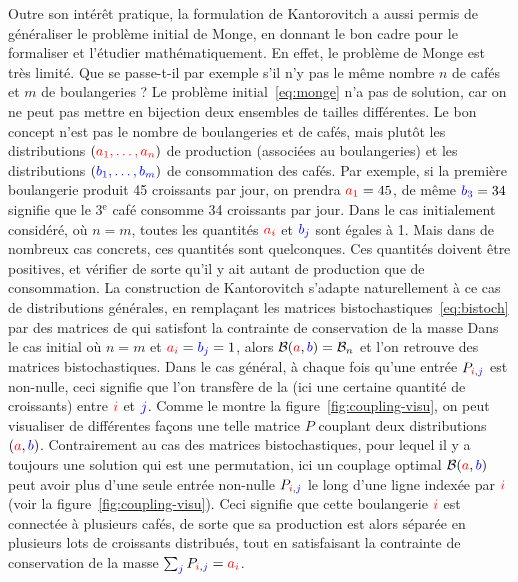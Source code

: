 Outre son intérêt pratique, la formulation de Kantorovitch a aussi permis de généraliser le problème initial de Monge, en donnant le bon cadre pour le formaliser et l'étudier mathématiquement. En effet, le problème de Monge est très limité. Que se passe-t-il par exemple s'il n'y pas le même nombre $n$ de cafés et $m$ de boulangeries ? Le problème initial~\eqref{eq:monge} n'a pas de solution, car on ne peut pas mettre en bijection deux ensembles de tailles différentes. Le bon concept n'est pas le nombre de boulangeries et de cafés, mais plutôt les distributions $({\color{red}a_1,\ldots,a_n})$ de production (associées au boulangeries) et les distributions $({\color{blue}b_1,\ldots,b_m})$ de consommation des cafés. 
%
Par exemple, si la première boulangerie produit 45 croissants par jour, on prendra ${\color{red}a_1} =45$, de même ${\color{blue}b_3} = 34$ signifie que le 3$^\text{e}$ café consomme 34 croissants par jour.
%
Dans le cas initialement considéré, où $n=m$, toutes les quantités ${\color{red}a_i}$ et ${\color{blue}b_j}$ sont égales à 1. Mais dans de nombreux cas concrets, ces quantités sont quelconques. Ces quantités doivent être positives, et vérifier 
de sorte qu'il y ait autant de production que de consommation. La construction de Kantorovitch s'adapte naturellement à ce cas de distributions générales, en remplaçant les matrices bistochastiques~\eqref{eq:bistoch} par des matrices de  qui satisfont la contrainte de conservation de la masse 
Dans le cas initial où $n=m$ et ${\color{red}a_i}={\color{blue}b_j}=1$, alors $\mathcal{B}({\color{red}a},{\color{blue}b}) = \mathcal{B}_n$ et l'on retrouve des matrices bistochastiques. Dans le cas général, à chaque fois qu'une entrée $P_{{\color{red}i},{\color{blue}j}}$ est non-nulle, ceci signifie que l'on transfère de la  (ici une certaine quantité de croissants) entre ${\color{red}i}$ et ${\color{blue}j}$. Comme le montre la figure~\ref{fig:coupling-visu}, on peut visualiser de différentes façons une telle matrice $P$ couplant deux distributions $({\color{red}a},{\color{blue}b})$.
%
Contrairement au cas des matrices bistochastiques, pour lequel il y a toujours une solution qui est une permutation, ici un couplage optimal $\mathcal{B}({\color{red}a},{\color{blue}b})$ peut avoir plus d'une seule entrée non-nulle $P_{{\color{red}i},{\color{blue}j}}$ le long d'une ligne indexée par ${\color{red}i}$ (voir la figure~\ref{fig:coupling-visu}). Ceci signifie que cette boulangerie ${\color{red}i}$ est connectée à plusieurs cafés, de sorte que sa production est alors séparée en plusieurs lots de croissants distribués, tout en satisfaisant la contrainte de conservation de la masse $\sum_{{\color{blue}j}} P_{{\color{red}i},{\color{blue}j}}={\color{red}a_i}$.

